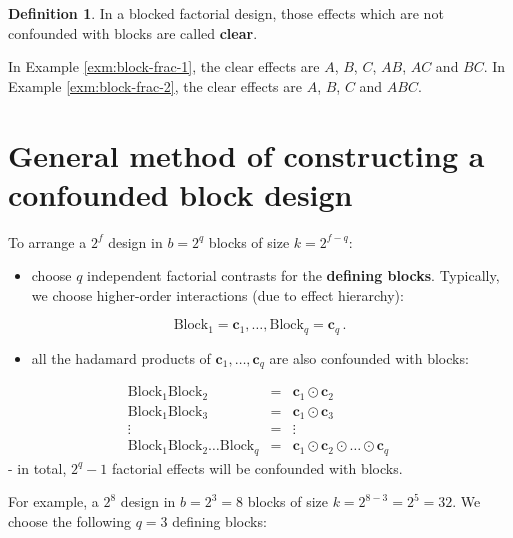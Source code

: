 \documentclass[
]{book}
\providecommand{\tightlist}{%
  \setlength{\itemsep}{0pt}\setlength{\parskip}{0pt}}
\theoremstyle{definition}
\newtheorem{definition}{Definition}[chapter]
\theoremstyle{definition}
\theoremstyle{definition}
\theoremstyle{definition}
\theoremstyle{remark}
\begin{document}
\begin{definition}
\protect\hypertarget{def:block-clear-effects}{}\label{def:block-clear-effects}In a blocked factorial design, those effects which are not confounded with blocks are called \textbf{clear}.
\end{definition}

In Example \ref{exm:block-frac-1}, the clear effects are \(A\), \(B\), \(C\), \(AB\), \(AC\) and \(BC\). In Example \ref{exm:block-frac-2}, the clear effects are \(A\), \(B\), \(C\) and \(ABC\).

\hypertarget{general-method-of-constructing-a-confounded-block-design}{%
\section{General method of constructing a confounded block design}\label{general-method-of-constructing-a-confounded-block-design}}

To arrange a \(2^{f}\) design in \(b=2^{q}\) blocks of size \(k=2^{f-q}\):

\begin{itemize}
\tightlist
\item
  choose \(q\) independent factorial contrasts for the \textbf{defining blocks}. Typically, we choose higher-order interactions (due to effect hierarchy):
\end{itemize}

\[
\mathrm{Block}_{1}=\boldsymbol{c}_{1},\ldots,\mathrm{Block}_{q} = \boldsymbol{c}_{q}\,.
\]

\begin{itemize}
\tightlist
\item
  all the hadamard products of \(\boldsymbol{c}_{1},\dots,\boldsymbol{c}_{q}\) are also confounded with blocks:
\end{itemize}

\[
\begin{array}{ccc}
\mathrm{Block}_{1}\mathrm{Block}_{2}&=&\boldsymbol{c}_{1}\odot\boldsymbol{c}_{2} \\
\mathrm{Block}_{1}\mathrm{Block}_{3}&=&\boldsymbol{c}_{1}\odot\boldsymbol{c}_{3} \\
\vdots&=&\vdots\\
\mathrm{Block}_{1}\mathrm{Block}_{2}\dots \mathrm{Block}_{q}&=&\boldsymbol{c}_{1}\odot\boldsymbol{c}_{2}\odot\dots\odot \boldsymbol{c}_{q}\
\end{array}
\]
- in total, \(2^q -1\) factorial effects will be confounded with blocks.

For example, a \(2^{8}\) design in \(b = 2^{3}=8\) blocks of size \(k = 2^{8-3}=2^{5}=32\). We choose the following \(q=3\) defining blocks:
\end{document}
